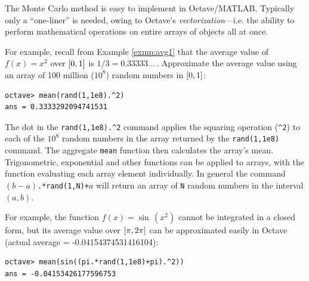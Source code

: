 \begin{exmp}\label{exmp:avgoctave}
\noindent The Monte Carlo method is easy to implement in Octave/MATLAB.
Typically only a ``one-liner'' is needed, owing to Octave's
\emph{vectorization}---i.e. the ability to perform mathematical operations on
entire arrays of objects all at once.\vspace{2mm}

\par\noindent For example, recall from Example \ref{exmp:avg1} that the average
value of $f(x)=x^2$ over $\lbrack 0,1 \rbrack$ is $1/3 = 0.33333\ldots\,$. Approximate
the average value using an array of 100 million ($10^8$) random numbers in
$\lbrack 0,1 \rbrack$:
\begin{Verbatim}[frame=single, framesep=2mm]
octave> mean(rand(1,1e8).^2)
ans = 0.3333292094741531
\end{Verbatim}
\noindent The dot in the \texttt{rand(1,1e8).\textasciicircum2} command applies
the squaring operation (\texttt{\textasciicircum 2}) to each of the $10^8$
random numbers in the array returned by the \texttt{rand(1,1e8)} command. The
aggregate \texttt{mean} function then calculates the array's mean.
Trigonometric, exponential and other functions can be applied to arrays, with
the function evaluating each array element individually. In general the
command \texttt{$(b-a)$.*rand(1,N)+$a$} will return an array of \texttt{N}
random numbers in the interval $(a,b)$.\vspace{2mm}

\noindent For example, the function $f(x)=\sin\,(x^2)$ cannot be integrated in a
closed form, but its average value over $\lbrack \pi,2\pi \rbrack$ can be
approximated easily in Octave (actual average = -0.04154374531416104):
\begin{Verbatim}[frame=single, framesep=2mm]
octave> mean(sin((pi.*rand(1,1e8)+pi).^2))
ans = -0.04153426177596753
\end{Verbatim}
\end{exmp}\vspace{-2mm}
\divider
\vspace{3mm}
\startexercises\label{sec8dot2}
